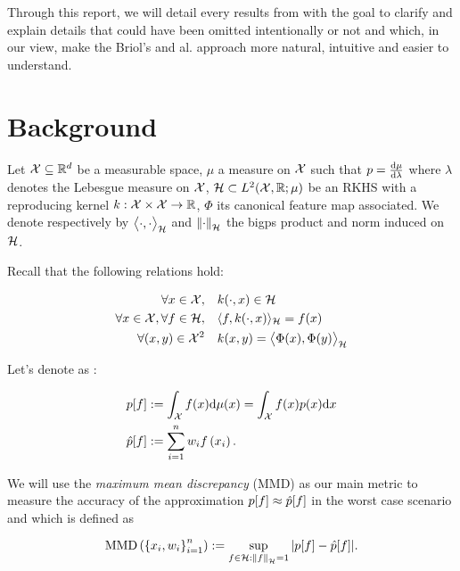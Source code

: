 \noindent
  Through this report, we will detail every results from \cite{FWBQ} with the goal
  to clarify and explain details that could have been omitted intentionally or not and which, in our view, make the Briol's and al. approach more natural, intuitive and easier
  to understand.

\section{Background}
Let $\mathcal{X} \subseteq \mathbb{R} ^ { d }$ be a measurable space, $\mu$ a measure on $\mathcal{X}$ such
that $p = \frac{\mathop{}\mathopen{}\mathrm{d} \mu}{ \mathop{}\mathopen{}\mathrm{d} \lambda}$ where $\lambda$ denotes the Lebesgue measure on $\mathcal{X}$,
  $\mathcal{H} \subset L^2(\mathcal{X}, \mathbb{R}; \mu)$ be an RKHS with a
 reproducing kernel $k: \mathcal{X} \times \mathcal{X} \rightarrow \mathbb{R}$, $\Phi$ its canonical feature
 map associated. We denote respectively by $\bigl \langle \cdot , \cdot \bigr \rangle_{\mathcal{H}}$ and $\norme{\cdot}$
 the bigps product and norm induced on $\mathcal{H}$.

 Recall that the following relations hold:
 \begin{boxexercise}
   \begin{align}
  \forall x \in \mathcal{X} , \quad &k ( \cdot , x ) \in \mathcal{H}\\
  \forall x \in \mathcal{X} , \forall f \in \mathcal{H} , \quad &\langle f , k ( \cdot , x ) \rangle _ { \mathcal{H} } = f ( x )\\
  \forall (x,y) \in \mathcal{X}^2 \quad &k(x,y) = \bigl \langle \Phi(x) , \Phi(y) \bigr \rangle_{\mathcal{H}}
  \end{align}
\end{boxexercise}


Let's denote as \cite{FWBQ}:
\begin{boxdefinition}
  \begin{align*}
    p[f] &:= \int _ { \mathcal{X} } f ( x ) \mathrm { d } \mu(x) = \int _ { \mathcal{X} } f ( x ) p ( x ) \mathrm { d } x\\
    \hat{p}[f]&:=\sum _ { i = 1 } ^ { n } w _ { i } f \left( x _ { i } \right).
  \end{align*}
\end{boxdefinition}


We will use the \textit{maximum mean discrepancy} (MMD) as our main metric to measure
 the accuracy of the approximation $p[f] \approx \hat{p}[f]$ in the worst case scenario and which is defined as
 \begin{boxdefinition}
    $$\MMD : = \sup _ { f \in \H : \norme{f}=1 } | p [ f ] - \hat { p } [ f ] |.$$
 \end{boxdefinition}

